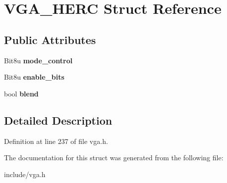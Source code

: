 \hypertarget{structVGA__HERC}{\section{V\-G\-A\-\_\-\-H\-E\-R\-C Struct Reference}
\label{structVGA__HERC}
}
\subsection*{Public Attributes}
\begin{DoxyCompactItemize}
\item 
\hypertarget{structVGA__HERC_ab6ac3f557c940847cfadec99c7f71c74}{Bit8u {\bfseries mode\-\_\-control}}\label{structVGA__HERC_ab6ac3f557c940847cfadec99c7f71c74}

\item 
\hypertarget{structVGA__HERC_a3583e1934895677bfdf4cd907b81c479}{Bit8u {\bfseries enable\-\_\-bits}}\label{structVGA__HERC_a3583e1934895677bfdf4cd907b81c479}

\item 
\hypertarget{structVGA__HERC_af5435dbc6b4458a9565c18d05741f979}{bool {\bfseries blend}}\label{structVGA__HERC_af5435dbc6b4458a9565c18d05741f979}

\end{DoxyCompactItemize}


\subsection{Detailed Description}


Definition at line 237 of file vga.\-h.



The documentation for this struct was generated from the following file\-:\begin{DoxyCompactItemize}
\item 
include/vga.\-h\end{DoxyCompactItemize}
